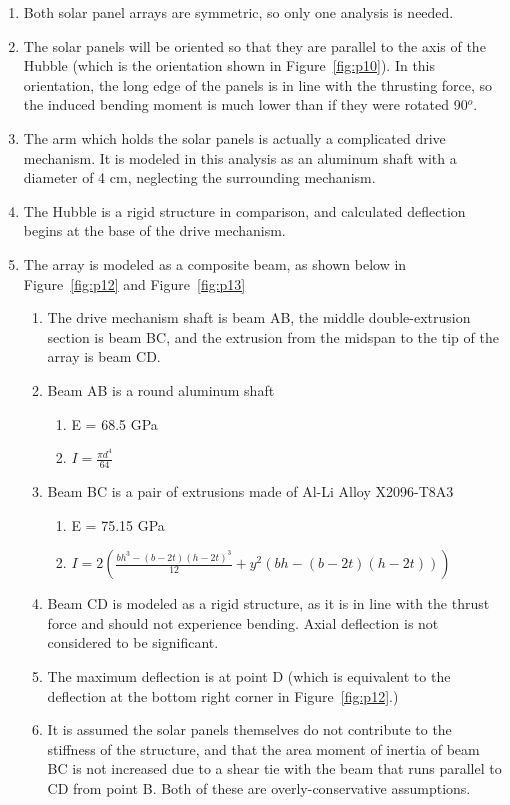\documentclass[paper=letter, fontsize=11pt]{scrartcl} %
\numberwithin{equation}{section} %
\numberwithin{figure}{section} %
\numberwithin{table}{section} %
\begin{document}
\begin{enumerate}
\item Both solar panel arrays are symmetric, so only one analysis is needed.
\item The solar panels will be oriented so that they are parallel to the axis of the Hubble (which is the orientation shown in Figure~\ref{fig:p10}). In this orientation, the long edge of the panels is in line with the thrusting force, so the induced bending moment is much lower than if they were rotated 90$^o$.
\item The arm which holds the solar panels is actually a complicated drive mechanism. It is modeled in this analysis as an aluminum shaft with a diameter of 4 cm, neglecting the surrounding mechanism.
\item The Hubble is a rigid structure in comparison, and calculated deflection begins at the base of the drive mechanism.
\item The array is modeled as a composite beam, as shown below in Figure~\ref{fig:p12} and Figure~\ref{fig:p13}
\begin{enumerate}
\item The drive mechanism shaft is beam AB, the middle double-extrusion section is beam BC, and the extrusion from the midspan to the tip of the array is beam CD.
\item Beam AB is a round aluminum shaft
\begin{enumerate}
\item   E = 68.5 GPa
\item $I = \frac{\pi d^4}{64}$
\end{enumerate}
\item Beam BC is a pair of extrusions made of Al-Li Alloy X2096-T8A3
\begin{enumerate}
\item   E = 75.15 GPa
\item $I = 2 \left(\frac{bh^3-(b-2t)(h-2t)^3}{12} + y^2(bh - (b-2t)(h-2t)) \right)$
\end{enumerate}
\item Beam CD is modeled as a rigid structure, as it is in line with the thrust force and should not experience bending. Axial deflection is not considered to be significant.
\item The maximum deflection is at point D (which is equivalent to the deflection at the bottom right corner in Figure~\ref{fig:p12}.)
\item It is assumed the solar panels themselves do not contribute to the stiffness of the structure, and that the area moment of inertia of beam BC is not increased due to a shear tie with the beam that runs parallel to CD from point B. Both of these are overly-conservative assumptions.

\end{enumerate}
\end{enumerate}
\end{document}
